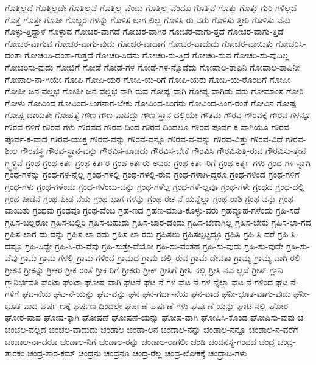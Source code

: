 {ಗೊತ್ತಿಲ್ಲದೆ
ಗೊತ್ತಿಲ್ಲದೇ
ಗೊತ್ತಿಲ್ಲವೆ
ಗೊತ್ತಿಲ್ಲ-ವೆಂದು
ಗೊತ್ತಿಲ್ಲ-ವೆಂದೂ
ಗೊತ್ತಿವೆ
ಗೊತ್ತು
ಗೊತ್ತು-ಗುರಿ-ಗಳಿಲ್ಲದೆ
ಗೊತ್ತೆ
ಗೊತ್ತೇ
ಗೊಪೀ
ಗೊಬ್ಬರ-ಗಳನ್ನು
ಗೊಳಿಸ-ಲಾಗ-ಲಿಲ್ಲ
ಗೊಳಿಸಿ-ರು-ವರು
ಗೊಳಿಸು-ತ್ತೀರಿ
ಗೊಳಿಸು-ವೆನು
ಗೊಳ್ಳು-ತ್ತಿದ್ದಾಳೆ
ಗೊಳ್ಳುವ
ಗೋಚರ-ವಾಗದೆ
ಗೋಚರ-ವಾಗಿರ
ಗೋಚರ-ವಾಗು-ತ್ತದೆ
ಗೋಚರ-ವಾಗು-ತ್ತಿದೆ
ಗೋಚರ-ವಾಗುವ
ಗೋಚರ-ವಾಗು-ವುದು
ಗೋಚರ-ವಾದಾಗ
ಗೋಚರ-ವಾದುದು
ಗೋಚರ-ವಾಯಿತು
ಗೋಚರಿಸಿ-ದಂತಾ
ಗೋಚರಿಸಿ-ದಂತಾ-ಗುತ್ತದೆ
ಗೋಚರಿ-ಸಿದನು
ಗೋಚರಿ-ಸು-ತ್ತಿದೆ
ಗೋಚರಿ-ಸುವ
ಗೋಚರಿ-ಸು-ವುದಿಲ್ಲ
ಗೋಚರಿಸು-ವುದು
ಗೋಜಿಗೆ
ಗೋಡೆ
ಗೋಡೆ-ಗಳ
ಗೋಡೆ-ಗಳ-ನ್ನೊಡೆದು
ಗೋಪಾಲ-ತಾಪಿನಿ
ಗೋಪಾಲ-ತಾಪಿನೀ
ಗೋಪಾಲ-ನಾ-ಗಿಯೇ
ಗೋಪಿ
ಗೋಪಿ-ಯರ
ಗೋಪಿ-ಯ-ರಿಗೆ
ಗೋಪಿ-ಯರು
ಗೋಪಿ-ಯ-ರೊಂದಿಗೆ
ಗೋಪೀ
ಗೋಪೀ-ಜನ-ವಲ್ಲಭ
ಗೋಪೀ-ಜನ-ವಲ್ಲಭ-ನಾಗಿ-ರುವ
ಗೋಪ್ಯ-ವಾಗಿ
ಗೋಪ್ಯ-ವಾಗಿಡು-ವರು
ಗೋಮಾಂಸ
ಗೋರಿ
ಗೋಳು
ಗೋವಿಂದ
ಗೋವಿಂದ-ಸಿಂಗನಾಗ-ಬೇಕು
ಗೋವಿಂದ-ಸಿಂಗನು
ಗೋವಿಂದ-ಸಿಂಗ-ರಂತೆ
ಗೋವಿನ
ಗೋಷ್ಪ
ಗೋಷ್ಪ-ದಾಯತೇ
ಗೋಹತ್ಯೆ
ಗೌಣ
ಗೌಣ-ವಾದದ್ದು
ಗೌಣ-ಸ್ಥಾನ-ದಲ್ಲಿಯೇ
ಗೌತಮ
ಗೌರವ
ಗೌರವಕ್ಕೆ
ಗೌರವ-ಗಳನ್ನೂ
ಗೌರವ-ಗಳಿಗೆ
ಗೌರವ-ಗಳು
ಗೌರವದ
ಗೌರವ-ದಿಂದ
ಗೌರವ-ದಿಂದಲೂ
ಗೌರವ-ಪೂರ್ವ-ಕ-ವಾಗಿಯೂ
ಗೌರವ-ಪೂರ್ವ-ಕ-ವಾದ
ಗೌರವ-ಯುಕ್ತ
ಗೌರವ-ವನ್ನು
ಗೌರವ-ವನ್ನೂ
ಗೌರವ-ವ-ವನ್ನು
ಗೌರವ-ವಿತ್ತು
ಗೌರವ-ವಿದೆ
ಗೌರವ-ಶೀಲ
ಗೌರವಸ್ಥ
ಗೌರವ-ಸ್ಥಾನ-ವನ್ನು
ಗೌರವಿಸ-ಕೂಡದು
ಗೌರವಿಸ-ಬೇಕೆ
ಗೌರವಿಸಿ
ಗೌರವಿಸುತ್ತಿ-ರುವ
ಗೌರವಿಸು-ತ್ತೇನೆ
ಗ್ಧ್ಧಳ್ಧಿವೆ
ಗ್ರಂಥ
ಗ್ರಂಥ-ಕರ್ತ
ಗ್ರಂಥ-ಕರ್ತರ
ಗ್ರಂಥ-ಕರ್ತರು-ಅವರು
ಗ್ರಂಥ-ಕರ್ತ-ರಿಗೆ
ಗ್ರಂಥ-ಕರ್ತೃ-ಗಳು
ಗ್ರಂಥ-ಗಳ-ನ್ನಾಗಿ
ಗ್ರಂಥ-ಗಳನ್ನು
ಗ್ರಂಥ-ಗಳ-ನ್ನೆಲ್ಲ
ಗ್ರಂಥ-ಗಳಲ್ಲಿ
ಗ್ರಂಥ-ಗಳಲ್ಲಿ-ರುವ
ಗ್ರಂಥ-ಗಳಾಗಿ-ದ್ದರೂ
ಗ್ರಂಥ-ಗಳಿಂದ
ಗ್ರಂಥ-ಗಳಿಗೆ
ಗ್ರಂಥ-ಗಳು
ಗ್ರಂಥ-ಗಳೆಂದು
ಗ್ರಂಥ-ಗಳೆಂಬು-ದನ್ನು
ಗ್ರಂಥ-ಗಳೆಲ್ಲ
ಗ್ರಂಥ-ಗಳೆ-ಲ್ಲವೂ
ಗ್ರಂಥ-ಗಳೇ
ಗ್ರಂಥದ
ಗ್ರಂಥ-ದಲ್ಲಿ
ಗ್ರಂಥ-ಪೀಡನೆ
ಗ್ರಂಥ-ಪೀಡ-ನೆಯ
ಗ್ರಂಥ-ಭಾಗ-ಗಳನ್ನು
ಗ್ರಂಥ-ರಚ-ನೆ-ಯನ್ನೆಲ್ಲಾ
ಗ್ರಂಥ-ರಾಶಿ
ಗ್ರಂಥ-ವನ್ನು
ಗ್ರಂಥ-ವಾಯಿತು
ಗ್ರಂಥವು
ಗ್ರಂಥವೂ
ಗ್ರಂಥ-ವೆಂಬ
ಗ್ರಹ-ಣದ
ಗ್ರಹಣ-ಮಾಡಿ-ಕೊಳ್ಳು-ವರು
ಗ್ರಹವ್ಯೂಹ-ಗಳೆಂದು
ಗ್ರಹಿ-ಸದೆ
ಗ್ರಹಿಸ-ಬಲ್ಲರೋ
ಗ್ರಹಿಸ-ಬಲ್ಲಿರಿ
ಗ್ರಹಿಸ-ಬಹುದು
ಗ್ರಹಿಸ-ಬಾರ-ದೆಂದು
ಗ್ರಹಿಸ-ಬೇಕಾಗಿಲ್ಲ
ಗ್ರಹಿಸ-ಬೇಕು
ಗ್ರಹಿಸ-ಲಾ-ಗದ
ಗ್ರಹಿಸ-ಲಾಗ-ದು-ದನ್ನು
ಗ್ರಹಿಸ-ಲಾ-ರದು
ಗ್ರಹಿಸ-ಲಾ-ರರು
ಗ್ರಹಿಸಲು
ಗ್ರಹಿಸಲ್ಪಟ್ಟದ್ದೂ
ಗ್ರಹಿಸಿ
ಗ್ರಹಿ-ಸಿ-ದರೆ
ಗ್ರಹಿ-ಸಿ-ದಷ್ಟೂ
ಗ್ರಹಿ-ಸಿದ್ದೇ
ಗ್ರಹಿ-ಸಿ-ರು-ವೆವು
ಗ್ರಹಿ-ಸುತ್ತೇ-ವೆಯೋ
ಗ್ರಹಿ-ಸು-ವಂತಹ
ಗ್ರಹಿ-ಸು-ವುದು
ಗ್ರಹಿ-ಸು-ವುದೇ
ಗ್ರಹಿ-ಸು-ವೆವು
ಗ್ರಾಮ
ಗ್ರಾಮ-ಗಳಲ್ಲಿ
ಗ್ರಾಮ-ಗಳಿಂದ
ಗ್ರಾಮದ
ಗ್ರಾಮ-ದಲ್ಲಿ-ರುವ
ಗ್ರಾಮ-ದೇವತಾ
ಗ್ರಾಮ್ಯ
ಗ್ರಾಮ್ಯ-ವಾಗಿ-ರಲಿ
ಗ್ರೀಕನ
ಗ್ರೀಕನ್ನು
ಗ್ರೀಕರ
ಗ್ರೀಕ-ರಂತೆ
ಗ್ರೀಕ-ರಿಗೆ
ಗ್ರೀಕರು
ಗ್ರೀಕ್
ಗ್ರೀಸಿಗೆ
ಗ್ರೀಸಿ-ನಲ್ಲಿ
ಗ್ರೀಸಿ-ನವ-ಲ್ಲದೆ
ಗ್ರೀಸ್
ಗ್ಲಾನಿ
ಗ್ಲಾನಿರ್ಭವತಿ
ಘಂಟಾ
ಘಂಟಾ-ಘೋಷ-ವಾಗಿ
ಘಟನೆ
ಘಟ-ನೆ-ಗಳ
ಘಟ-ನೆ-ಗಳ-ನ್ನೆಲ್ಲಾ
ಘಟ-ನೆ-ಗಳಿಂದ
ಘಟ-ನೆ-ಗಳಿಗೆ
ಘಟ-ನೆಯ
ಘಟ-ನೆ-ಯನ್ನು
ಘಟ-ವನ್ನು
ಘನ
ಘನ-ಗರ್ಜ-ನೆಯ
ಘನ-ವಾದ
ಘನೀ-ಭೂತ-ವಾಗು-ವುದು
ಘನೀ-ಭೂತ-ವಾದ
ಘರ್ಷ-ಣಕ್ಕೆ
ಘರ್ಷಣ-ದಿಂದಲೇ
ಘರ್ಷಣೆ
ಘರ್ಷಣೆ-ಗಳು
ಘರ್ಷಣೆ-ಯನ್ನು
ಘಾಟಿ-ನಲ್ಲಿ
ಘೋರ
ಘೋರ-ಪಾಪ
ಘೋಷ-ಕ್ಕಾಗಿ
ಘೋಷಣೆ
ಘೋಷಣೆ-ಯನ್ನು
ಘೋಷ-ವಾಗಿ
ಘೋಷಿಸಿ-ಕೊಂಡ
ಘೋಷಿಸು-ವುವು
ಚ
ಚಂಚಲ-ವಲ್ಲದ
ಚಂಚಲ-ವಾದುದು
ಚಂಡಾಲ
ಚಂಡಾ-ಲನ
ಚಂಡಾಲ-ನನ್ನು
ಚಂಡಾಲ-ನನ್ನೂ
ಚಂಡಾಲ-ನ-ವರೆಗೆ
ಚಂಡಾಲ-ನಾ-ದರೂ
ಚಂಡಾಲ-ನಿಗೆ
ಚಂಡಾಲ-ರನ್ನು
ಚಂಡಾಲ-ರಾಗಲೀ
ಚಂಡಿ
ಚಂದನಸ್ಯ-ಗಂಧದ
ಚಂದ್ರ
ಚಂದ್ರ-ತಾರಕಂ
ಚಂದ್ರ-ತಾರ-ಕಮ್
ಚಂದ್ರನು
ಚಂದ್ರನೂ
ಚಂದ್ರ-ರೆಲ್ಲ
ಚಂದ್ರ-ಲೋಕಕ್ಕೆ
ಚಂದ್ರಾದಿ-ಗಳು
}
